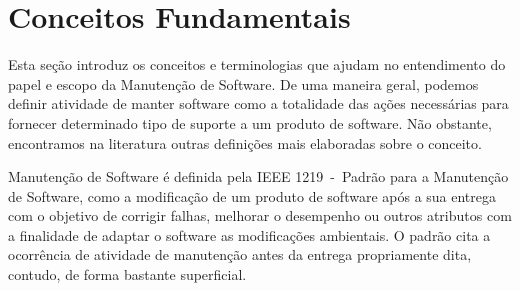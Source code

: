 %
%
%
%
\section{Conceitos Fundamentais}
\label{sec:conceitos_basicos}
Esta seção introduz os conceitos e terminologias que ajudam no entendimento do papel e
escopo da Manutenção de Software. De uma maneira geral, podemos definir atividade de manter software
como a totalidade das ações necessárias para fornecer determinado tipo de suporte a um produto de software. 
Não obstante, encontramos na literatura outras definições mais elaboradas sobre o
conceito.

Manutenção de Software é definida pela IEEE 1219~\cite{720567}-~Padrão para a Manutenção de
Software, como a modificação de um produto de software após a sua entrega com o objetivo
de corrigir falhas, melhorar o desempenho ou outros atributos com a finalidade de adaptar o software
as modificações ambientais. O padrão cita a ocorrência de atividade de manutenção antes da entrega
propriamente dita, contudo, de forma bastante superficial.

